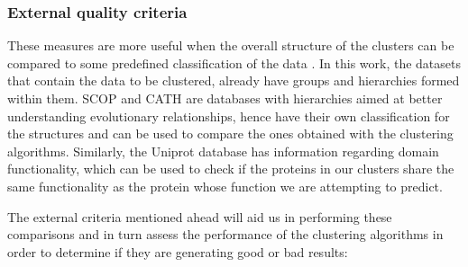 \subsubsection{External quality criteria}
These measures are more useful when the overall structure of the clusters can be compared to some predefined classification of the data \cite{rokach2005clustering}. In this work, the datasets that contain the data to be clustered, already have groups and hierarchies formed within them. SCOP and CATH are databases with hierarchies aimed at better understanding evolutionary relationships, hence have their own classification for the structures and can be used to compare the ones obtained with the clustering algorithms. Similarly, the Uniprot database has information regarding domain functionality, which can be used to check if the proteins in our clusters share the same functionality as the protein whose function we are attempting to predict. 

The external criteria mentioned ahead will aid us in performing these comparisons and in turn assess the performance of the clustering algorithms in order to determine if they are generating good or bad results:

